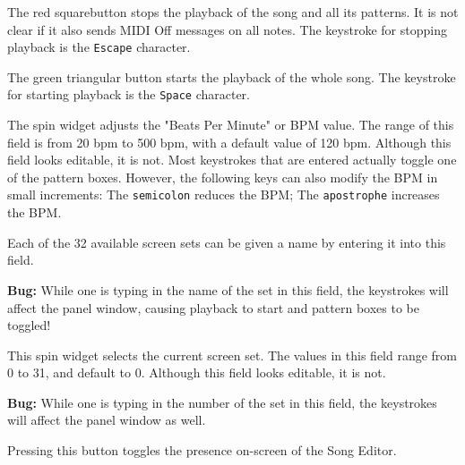    \setcounter{ItemCounter}{0}      %

   The red squarebutton stops the playback of the song and all its patterns.
   It is not clear if it also sends MIDI Off messages on all notes.
   The keystroke for stopping playback is the \texttt{Escape} character.

   The green triangular button starts the playback of the whole song.
   The keystroke for starting playback is the \texttt{Space} character.

   The spin widget adjusts the "Beats Per Minute" or BPM value.  The
   range of this field is from 20 bpm to 500 bpm, with a default value of
   120 bpm.
   Although this field looks editable, it is not.  Most keystrokes
   that are entered actually toggle one of the pattern boxes.
   However, the following keys can also modify the BPM in small increments:
    The \texttt{semicolon} reduces the BPM;
    The \texttt{apostrophe} increases the BPM.

   Each of the 32 available screen sets can be given a name by entering it
   into this field.

   \textbf{Bug:}
   While one is typing in the name of the set in this field, the keystrokes
   will affect the panel window, causing playback to start and pattern
   boxes to be toggled!

   This spin widget selects the current screen set.  The values in this
   field range from 0 to 31, and default to 0.
   Although this field looks editable, it is not.

   \textbf{Bug:}
   While one is typing in the number of the set in this field, the keystrokes
   will affect the panel window as well.

   Pressing this button toggles the presence on-screen of the Song
   Editor.

